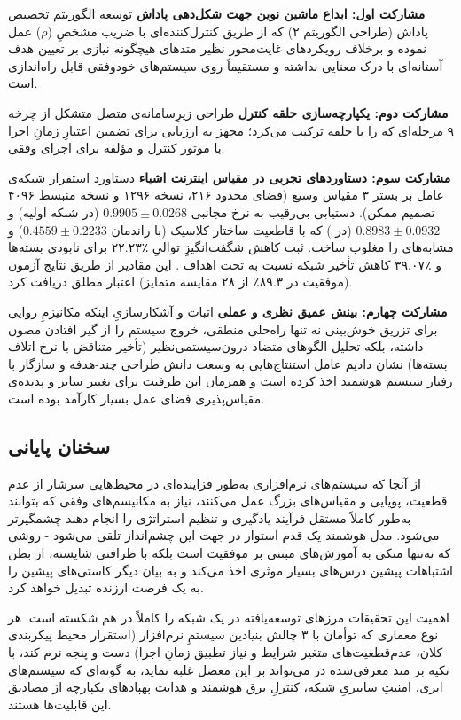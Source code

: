 \documentclass[oneside,openany,phd]{TMU-Thesis}
\begin{document}
\textbf{مشارکت اول: ابداع ماشین نوین جهت شکل‌دهی پاداش}
توسعه الگوریتم تخصیص پاداش (طراحی الگوریتم ۲) که از طریق کنترل‌کننده‌ای با ضریب مشخصِ ($\rho$) عمل نموده و برخلاف رویکردهای غایت‌محور نظیر متدهای  هیچگونه نیازی بر تعیین هدف آستانه‌ای با درک معنایی نداشته و مستقیماً روی سیستم‌های خودوفقی قابل راه‌اندازی است.

\textbf{مشارکت دوم: یکپارچه‌سازی حلقه کنترل }
طراحی زیرِسامانه‌ی متصل متشکل از چرخه ۹ مرحله‌ای که  را با حلقه  ترکیب می‌کرد؛ مجهز به ارزیابی برای تضمین اعتبارِ زمانِ اجرا با موتور کنترل  و مؤلفه  برای اجرای وفقی.

\textbf{مشارکت سوم: دستاوردهای تجربی در مقیاس اینترنت اشیاء}
دستاورد استقرار شبکه‌ی عامل بر بستر ۳ مقیاس وسیع (فضای محدود ۲۱۶، نسخه ۱۲۹۶ و نسخه منبسط ۴۰۹۶ تصمیم ممکن). دستیابی بی‌رقیب به نرخ مجانبی $0.9905 \pm 0.0268$ (در شبکه اولیه) و $0.8983 \pm 0.0932$ (در ) که با قاطعیت ساختار کلاسیک  (با راندمان $0.4559 \pm 0.2233$) و مشابه‌های  را مغلوب ساخت. ثبت کاهش شگفت‌انگیزِ توالیِ ٪۲۲.۲۳ برای نابودی بسته‌ها و ٪۳۹.۰۷ کاهش تأخیر شبکه‌ نسبت به  تحت اهداف . این مقادیر از طریق نتایج آزمون  (موفقیت در ۸۹.۳٪ از ۲۸ مقایسه متمایز) اعتبار مطلق دریافت کرد.

\textbf{مشارکت چهارم: بینش عمیق نظری و عملی}
اثبات و آشکارسازیِ اینکه مکانیزمِ روایی برای تزریق خوش‌بینی نه تنها راه‌حلی منطقی، خروج سیستم را از گیر افتادن مصون داشته، بلکه تحلیل الگوهای متضاد درون‌سیستمی‌نظیر (تأخیر متناقض با نرخ اتلاف بسته‌ها) نشان دادیم عامل استنتاج‌هایی به وسعت دانش طراحی چند-هدفه و سازگار با رفتار سیستم هوشمند اخذ کرده است و همزمان این ظرفیت برای تغییر سایز و پدیده‌ی مقیاس‌پذیری فضای عمل بسیار کارآمد بوده است.

\subsection{سخنان پایانی}

از آنجا که سیستم‌های نرم‌افزاری به‌طور فزاینده‌ای در محیط‌هایی سرشار از عدم قطعیت، پویایی و مقیاس‌های بزرگ عمل می‌کنند، نیاز به مکانیسم‌های وفقی که بتوانند به‌طور کاملاً مستقل فرآیند یادگیری و تنظیم استراتژی را انجام دهند چشمگیرتر می‌شود. مدل هوشمند  یک قدم استوار در جهت این چشم‌انداز تلقی می‌شود - روشی که نه‌تنها متکی به آموزش‌های مبتنی بر موفقیت است بلکه با ظرافتی شایسته، از بطن اشتباهات پیشین درس‌های بسیار موثری اخذ می‌کند و به بیان دیگر کاستی‌های پیشین را به یک فرصت ارزنده تبدیل خواهد کرد.

اهمیت این تحقیقات مرزهای توسعه‌یافته در یک شبکه  را کاملاً در هم شکسته است. هر نوع معماری که توأمان با ۳ چالش بنیادین سیستمِ نرم‌افزار (استقرار محیط پیکربندی کلان، عدم‌قطعیت‌های متغیر شرایط و نیاز تطبیق زمانِ اجرا) دست و پنجه نرم کند، با تکیه بر متد معرفی‌شده در  می‌تواند بر این معضل غلبه نماید، به گونه‌ای که سیستم‌های ابری، امنیتِ سایبریِ شبکه‌، کنترلِ برق هوشمند و هدایت پهپادهای یکپارچه از مصادیق این قابلیت‌ها هستند.
\end{document}
